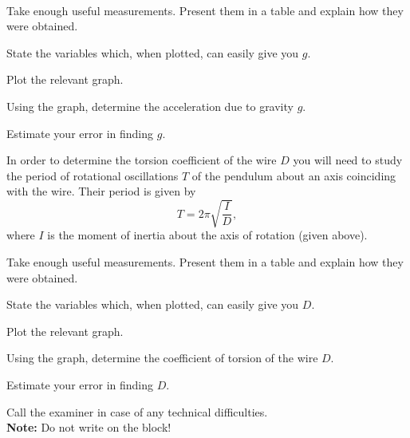 \documentclass[../TST.tex]{subfiles}
\begin{document}
\begin{eproblem}{\ \\[5pt]}
\begin{subpart}
	\item Take enough useful measurements. Present them in a table and explain how they were obtained. 
	\item State the variables which, when plotted, can easily give you $g$. 
	\item Plot the relevant graph. 
	\item Using the graph, determine the acceleration due to gravity $g$. 
	\item Estimate your error in finding $g$. \\
\end{subpart}
In order to determine the torsion coefficient of the wire $D$ you will need to study the period of rotational oscillations $T$ of the pendulum about an axis coinciding with the wire. Their period is given by
\begin{equation*}
	T=2\pi\sqrt{\frac{I}{D}}
,
\end{equation*}
where $I$ is the moment of inertia about the axis of rotation (given above).
\begin{subpart}[resume]
	\item Take enough useful measurements. Present them in a table and explain how they were obtained. 
	\item State the variables which, when plotted, can easily give you $D$. 
	\item Plot the relevant graph. 
	\item Using the graph, determine the coefficient of torsion of the wire $D$. 
	\item Estimate your error in finding $D$. 
\end{subpart}
Call the examiner in case of any technical difficulties.\\

\textbf{Note:} Do not write on the block! 
\end{eproblem}
\end{document}

